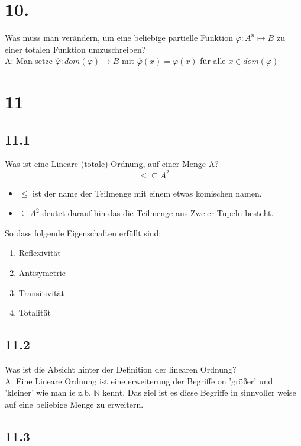 \section*{10.}
    Was muss man verändern, um eine beliebige partielle Funktion \(\varphi: A^n \mapsto B\) zu einer totalen Funktion umzuschreiben?
    \vspace*{0.5cm}
    \\
    A: Man setze \(\hat{\varphi} : dom(\varphi) \to B\) mit \(\hat{ \varphi} (x) = \varphi(x)\) für alle \(x \in dom(\varphi)\) 
    
\section*{11} 
    \subsection*{11.1}
        Was ist eine Lineare (totale) Ordnung, auf einer Menge A?  
        \vspace*{0.5cm}
        \\
        \[\leq \subseteq A^2\]
        \begin{itemize}
            \item \(\leq\) ist der name der Teilmenge mit einem etwas komischen namen.
            \item \(\subseteq A^2\) deutet darauf hin das die Teilmenge aus Zweier-Tupeln besteht.
        \end{itemize}
        So dass folgende Eigenschaften erfüllt sind:
        \begin{enumerate}
            \item Reflexivität
            \item Antisymetrie
            \item Transitivität
            \item Totalität
        \end{enumerate}

    \subsection*{11.2}
        Was ist die Absicht hinter der Definition der linearen Ordnung?
        \vspace*{0.5cm}
        \\
        A: Eine Lineare Ordnung ist eine erweiterung der Begriffe on 'größer' und 'kleiner' wie man ie z.b. \(\mathbb{N}\) kennt. Das ziel ist es diese Begriffe in sinnvoller weise auf eine beliebige Menge zu erweitern.
    
    \subsection*{11.3}
        
